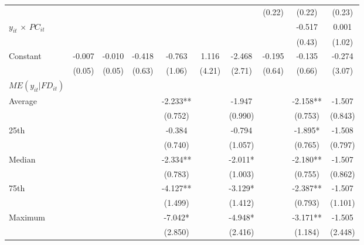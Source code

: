 \documentclass[12pt, a4paper]{article}
\begin{document}
\begin{table}
\begin{threeparttable}
{\begin{tabular}{l*{9}{c}}
				&                     &                     &                     &                     &                     &                     &      (0.22)         &      (0.22)         &      (0.23)         \\
				$y_{it}$ $\times$ $PC_{it}$ &                     &                     &                     &                     &                     &                     &                     &      -0.517         &       0.001         \\
				&                     &                     &                     &                     &                     &                     &                     &      (0.43)         &      (1.02)         \\
				Constant            &      -0.007         &      -0.010         &      -0.418         &      -0.763         &       1.116         &      -2.468         &      -0.195         &      -0.135         &      -0.274         \\
				&      (0.05)         &      (0.05)         &      (0.63)         &      (1.06)         &      (4.21)         &      (2.71)         &      (0.64)         &      (0.66)         &      (3.07)         \\
				\hline
				$ME(y_{it}|FD_{it})$ \\
				Average&&&&	-2.233** 	&&	-1.947&&	 	-2.158** 	&	-1.507\\
				&&&&(0.752)  && 		(0.990)	 &&	(0.753)   	&	(0.843)\\
				
				25th&&&&	-0.384   &&		-0.794	 &&	-1.895*  	&	-1.508\\
				&&&&(0.740)   &&		(1.057)	&& 	(0.765)   	&	(0.797)\\
				
				Median&&&&	-2.334** 	&&	-2.011*	&& 	-2.180** 	&	-1.507\\
				&&&&(0.783)   &&		(1.003)	 &&	(0.755)   &		(0.862)\\
				
				75th&&&&	-4.127** &&		-3.129*	 &&	-2.387** 	&	-1.507\\
				&&&&(1.499)   	&&	(1.412)	 &&	(0.793)   &		(1.101)\\
				
				Maximum&&&&	-7.042*  	&&	-4.948*	 &&	-3.171** 	&	-1.505\\
				&&&&(2.850)   &&		(2.416)	 &&	(1.184)   	&	(2.448)\\
				

\end{tabular}}
\end{threeparttable}
\end{table}
\end{document}
